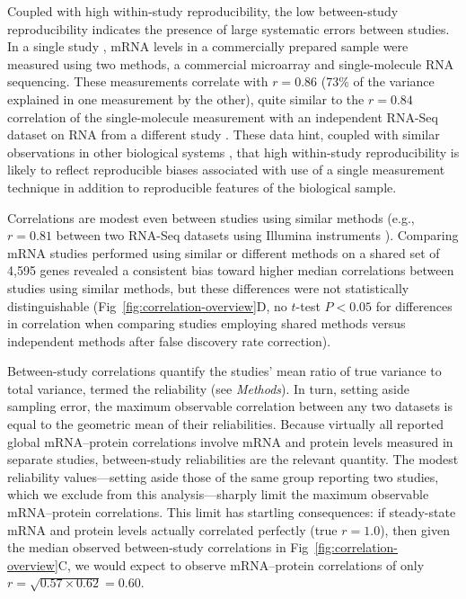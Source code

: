 \documentclass[10pt]{article}
\begin{document}
Coupled with high within-study reproducibility, the low between-study
reproducibility indicates the presence of large systematic errors
between studies. In a single study \cite{lipson09}, mRNA levels in a commercially prepared sample were measured using two methods, a commercial microarray and single-molecule RNA sequencing. These measurements correlate with $r=0.86$ (73\% of the variance explained in one measurement by the other), quite similar to the $r=0.84$ correlation of the single-molecule measurement with an independent RNA-Seq dataset on RNA from a different study \cite{yassour09}. These data hint, coupled with similar observations in other biological systems \cite{marioni08}, that high within-study reproducibility is likely to reflect reproducible biases associated with use of a single measurement technique in addition to reproducible features of the biological sample.

Correlations are modest even between studies using similar methods (e.g., \(r=0.81\) between
two RNA-Seq datasets using Illumina instruments \cite{ingolia09, yassour09}). Comparing mRNA studies performed using similar or different methods on a shared set of 4,595 genes revealed a consistent bias toward higher median correlations between studies using similar methods, but these differences were not statistically distinguishable (Fig~\ref{fig:correlation-overview}D, no \(t\)-test \(P<0.05\) for differences in correlation when comparing studies employing shared methods versus independent methods after false discovery rate correction).

Between-study correlations quantify the studies' mean ratio of true
variance to total variance, termed the reliability
\cite{archer08,schmidt99,Vogel2010} (see \emph{Methods}). In turn, setting aside
sampling error, the maximum observable correlation between any two
datasets is equal to the geometric mean of their
reliabilities. Because virtually all reported global mRNA--protein
correlations involve mRNA and protein levels measured in separate
studies, between-study reliabilities are the relevant quantity. The
modest reliability values---setting aside those of the same group
reporting two studies, which we exclude from this analysis---sharply
limit the maximum observable mRNA--protein correlations. This limit has
startling consequences: if steady-state mRNA and protein levels
actually correlated perfectly (true \(r=1.0\)), then given the median
observed between-study correlations in Fig~\ref{fig:correlation-overview}C, we would
expect to observe mRNA--protein correlations of only
\(r=\sqrt{0.57\times0.62}=0.60\).
\end{document}
